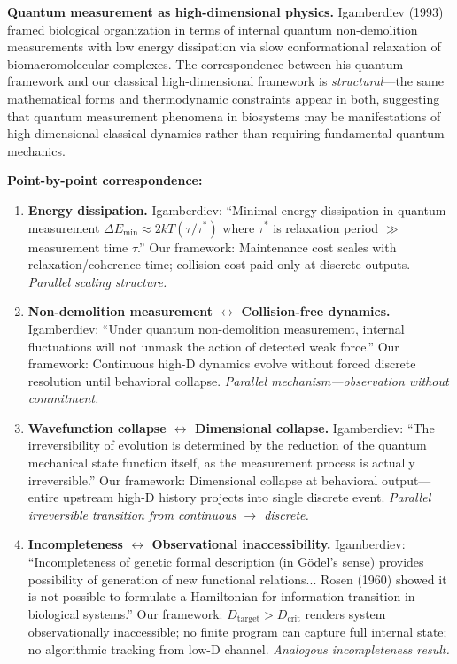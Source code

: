 \documentclass[12pt]{article}
\begin{document}
\textbf{Quantum measurement as high-dimensional physics.} Igamberdiev (1993) \cite{igamberdiev1993} framed biological organization in terms of internal quantum non-demolition measurements with low energy dissipation via slow conformational relaxation of biomacromolecular complexes. The correspondence between his quantum framework and our classical high-dimensional framework is \textit{structural}---the same mathematical forms and thermodynamic constraints appear in both, suggesting that quantum measurement phenomena in biosystems may be manifestations of high-dimensional classical dynamics rather than requiring fundamental quantum mechanics.

\textbf{Point-by-point correspondence:}

\begin{enumerate}
\item \textbf{Energy dissipation.} Igamberdiev: ``Minimal energy dissipation in quantum measurement $\Delta E_{\text{min}} \approx 2kT(\tau/\tau^*)$ where $\tau^*$ is relaxation period $\gg$ measurement time $\tau$.'' Our framework: Maintenance cost scales with relaxation/coherence time; collision cost paid only at discrete outputs. \textit{Parallel scaling structure.}

\item \textbf{Non-demolition measurement $\leftrightarrow$ Collision-free dynamics.} Igamberdiev: ``Under quantum non-demolition measurement, internal fluctuations will not unmask the action of detected weak force.'' Our framework: Continuous high-D dynamics evolve without forced discrete resolution until behavioral collapse. \textit{Parallel mechanism—observation without commitment.}

\item \textbf{Wavefunction collapse $\leftrightarrow$ Dimensional collapse.} Igamberdiev: ``The irreversibility of evolution is determined by the reduction of the quantum mechanical state function itself, as the measurement process is actually irreversible.'' Our framework: Dimensional collapse at behavioral output—entire upstream high-D history projects into single discrete event. \textit{Parallel irreversible transition from continuous $\to$ discrete.}

\item \textbf{Incompleteness $\leftrightarrow$ Observational inaccessibility.} Igamberdiev: ``Incompleteness of genetic formal description (in Gödel's sense) provides possibility of generation of new functional relations... Rosen (1960) showed it is not possible to formulate a Hamiltonian for information transition in biological systems.'' Our framework: $D_{\text{target}} > D_{\text{crit}}$ renders system observationally inaccessible; no finite program can capture full internal state; no algorithmic tracking from low-D channel. \textit{Analogous incompleteness result.}


\end{enumerate}
\end{document}
